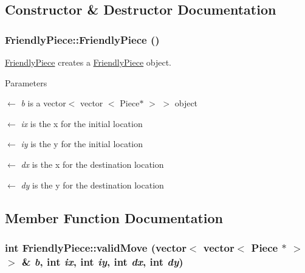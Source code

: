 \subsection{Constructor \& Destructor Documentation}
\hypertarget{classFriendlyPiece_ac366bba74bf5c47475beb9da05875407}{
\subsubsection[{FriendlyPiece}]{\setlength{\rightskip}{0pt plus 5cm}FriendlyPiece::FriendlyPiece ()}}
\label{classFriendlyPiece_ac366bba74bf5c47475beb9da05875407}


\hyperlink{classFriendlyPiece}{FriendlyPiece} creates a \hyperlink{classFriendlyPiece}{FriendlyPiece} object. 
\begin{DoxyParams}{Parameters}
\item[\mbox{$\leftarrow$} {\em b}]is a vector$<$ vector $<$ Piece$\ast$ $>$ $>$ object \item[\mbox{$\leftarrow$} {\em ix}]is the x for the initial location \item[\mbox{$\leftarrow$} {\em iy}]is the y for the initial location \item[\mbox{$\leftarrow$} {\em dx}]is the x for the destination location \item[\mbox{$\leftarrow$} {\em dy}]is the y for the destination location \end{DoxyParams}


\subsection{Member Function Documentation}
\hypertarget{classFriendlyPiece_aafce56ffcfb8c78a41529d482a89737d}{
\subsubsection[{validMove}]{\setlength{\rightskip}{0pt plus 5cm}int FriendlyPiece::validMove (vector$<$ vector$<$ {\bf Piece} $\ast$ $>$ $>$ \& {\em b}, \/  int {\em ix}, \/  int {\em iy}, \/  int {\em dx}, \/  int {\em dy})}}
\label{classFriendlyPiece_aafce56ffcfb8c78a41529d482a89737d}


